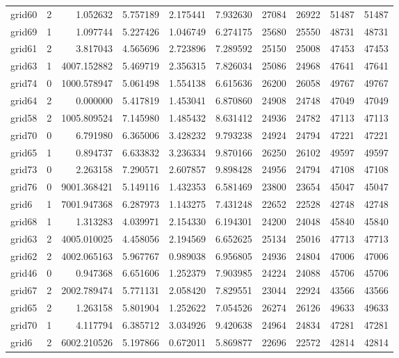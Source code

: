 \begin{longtable}{|l|r|r|r|r|r|r|r|r|r|}
grid60 & 2 & 1.052632 & 5.757189 & 2.175441 & 7.932630 & 27084 & 26922 & 51487 & 51487 \\
grid69 & 1 & 1.097744 & 5.227426 & 1.046749 & 6.274175 & 25680 & 25550 & 48731 & 48731 \\
grid61 & 2 & 3.817043 & 4.565696 & 2.723896 & 7.289592 & 25150 & 25008 & 47453 & 47453 \\
grid63 & 1 & 4007.152882 & 5.469719 & 2.356315 & 7.826034 & 25086 & 24968 & 47641 & 47641 \\
grid74 & 0 & 1000.578947 & 5.061498 & 1.554138 & 6.615636 & 26200 & 26058 & 49767 & 49767 \\
grid64 & 2 & 0.000000 & 5.417819 & 1.453041 & 6.870860 & 24908 & 24748 & 47049 & 47049 \\
grid58 & 2 & 1005.809524 & 7.145980 & 1.485432 & 8.631412 & 24936 & 24782 & 47113 & 47113 \\
grid70 & 0 & 6.791980 & 6.365006 & 3.428232 & 9.793238 & 24924 & 24794 & 47221 & 47221 \\
grid65 & 1 & 0.894737 & 6.633832 & 3.236334 & 9.870166 & 26250 & 26102 & 49597 & 49597 \\
grid73 & 0 & 2.263158 & 7.290571 & 2.607857 & 9.898428 & 24956 & 24794 & 47108 & 47108 \\
grid76 & 0 & 9001.368421 & 5.149116 & 1.432353 & 6.581469 & 23800 & 23654 & 45047 & 45047 \\
grid6 & 1 & 7001.947368 & 6.287973 & 1.143275 & 7.431248 & 22652 & 22528 & 42748 & 42748 \\
grid68 & 1 & 1.313283 & 4.039971 & 2.154330 & 6.194301 & 24200 & 24048 & 45840 & 45840 \\
grid63 & 2 & 4005.010025 & 4.458056 & 2.194569 & 6.652625 & 25134 & 25016 & 47713 & 47713 \\
grid62 & 2 & 4002.065163 & 5.967767 & 0.989038 & 6.956805 & 24936 & 24804 & 47006 & 47006 \\
grid46 & 0 & 0.947368 & 6.651606 & 1.252379 & 7.903985 & 24224 & 24088 & 45706 & 45706 \\
grid67 & 2 & 2002.789474 & 5.771131 & 2.058420 & 7.829551 & 23044 & 22924 & 43566 & 43566 \\
grid65 & 2 & 1.263158 & 5.801904 & 1.252622 & 7.054526 & 26274 & 26126 & 49633 & 49633 \\
grid70 & 1 & 4.117794 & 6.385712 & 3.034926 & 9.420638 & 24964 & 24834 & 47281 & 47281 \\
grid6 & 2 & 6002.210526 & 5.197866 & 0.672011 & 5.869877 & 22696 & 22572 & 42814 & 42814 \\

\end{longtable}
